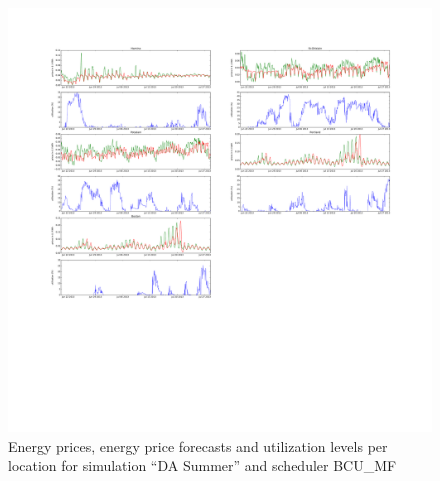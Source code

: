 \begin{figure}[htbp]
	\centering
	\vspace*{-0.6in}
	\hspace*{-1.9in}
		\includegraphics[width=1.60\textwidth]{figures/appendix_simulation_results/DA_Summer_scenario_6.pdf}
	\vspace*{-2.8in}
	\caption{Energy prices, energy price forecasts and utilization levels per location for simulation ``DA Summer'' and scheduler BCU\_MF}
	\label{fig:app_DA_Summer_scenario_6}
\end{figure}

